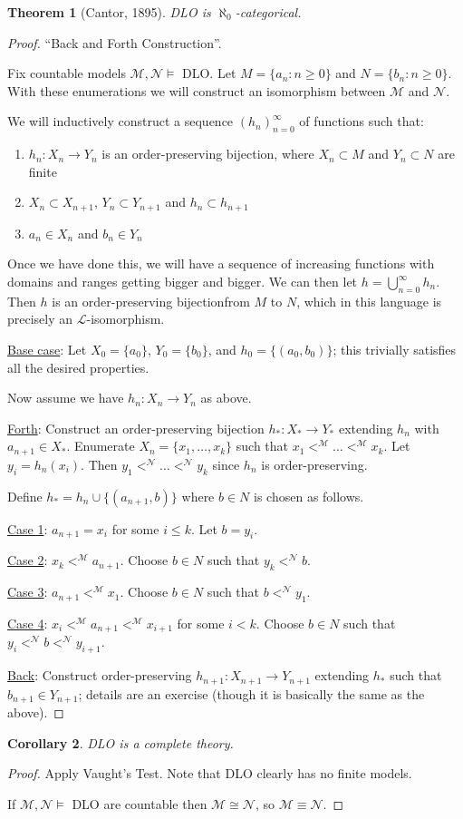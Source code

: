 \documentclass[]{article}
\theoremstyle{custhm}
\newtheorem{theorem}{Theorem}[section]
\theoremstyle{cusdef}
\theoremstyle{custhm}
\theoremstyle{custhm}
\newtheorem{cor}[theorem]{Corollary}
\theoremstyle{custhm}
\theoremstyle{ex}
\theoremstyle{custhm}
\theoremstyle{cusdef}
\theoremstyle{remark}
\newcommand{\ra}{\rightarrow}
\renewcommand{\L}{\mathcal{L}}
\newcommand{\M}{\mathcal{M}}
\newcommand{\N}{\mathcal{N}}
\begin{document}
\begin{theorem}[Cantor, 1895]
DLO is $\aleph_0$-categorical.
\end{theorem}
\begin{proof}
``Back and Forth Construction''.

Fix countable models $\M,\N\models$ DLO. Let $M = \{a_n:n\ge 0\}$ and $N = \{b_n:n\ge 0\}$. With these enumerations we will construct an isomorphism between $\M$ and $\N$.

We will inductively construct a sequence $(h_n)_{n=0}^{\infty}$ of functions such that:
\begin{enumerate}[label=\arabic*)]
	\item $h_n:X_n\ra Y_n$ is an order-preserving bijection, where $X_n\subset M$ and $Y_n\subset N$ are finite
	\item $X_n\subset X_{n+1}$, $Y_n\subset Y_{n+1}$ and $h_n\subset h_{n+1}$
	\item $a_n \in X_n$ and $b_n \in Y_n$
\end{enumerate}
Once we have done this, we will have a sequence of increasing functions with domains and ranges getting bigger and bigger. We can then let $h = \bigcup_{n=0}^{\infty}h_n$. Then $h$ is an order-preserving bijectionfrom $M$ to $N$, which in this language is precisely an $\L$-isomorphism.

\underline{Base case}: Let $X_0 = \{a_0\}$, $Y_0 = \{b_0\}$, and $h_0 = \{(a_0,b_0)\}$; this trivially satisfies all the desired properties.

Now assume we have $h_n:X_n\ra Y_n$ as above.

\underline{Forth}: Construct an order-preserving bijection $h_\ast:X_\ast\ra Y_\ast$ extending $h_n$ with $a_{n+1}\in X_\ast$. Enumerate $X_n = \{x_1,\dots,x_k\}$ such that $x_1 <^\M \dots <^\M x_k$. Let $y_i = h_n(x_i)$. Then $y_1 <^\N \dots <^\N y_k$ since $h_n$ is order-preserving.

Define $h_\ast = h_n \cup \{(a_{n+1},b)\}$ where $b\in N$ is chosen as follows.

\underline{Case 1}: $a_{n+1} = x_i$ for some $i\le k$. Let $b = y_i$.

\underline{Case 2}: $x_k <^\M a_{n+1}$. Choose $b\in N$ such that $y_k <^\N b$.

\underline{Case 3}: $a_{n+1} <^\M x_1$. Choose $b\in N$ such that $b <^\N y_1$.

\underline{Case 4}: $x_i <^\M a_{n+1} <^\M x_{i+1}$ for some $ i < k$. Choose $b \in N$ such that $y_i < ^\N b < ^\N y_{i+1}$.

\underline{Back}: Construct order-preserving $h_{n+1}:X_{n+1}\ra Y_{n+1}$ extending $h_\ast$ such that $b_{n+1}\in Y_{n+1}$; details are an exercise (though it is basically the same as the above).
\end{proof}
\begin{cor}
DLO is a complete theory.
\end{cor}
\begin{proof}
Apply Vaught's Test. Note that DLO clearly has no finite models.

If $\M,\N\models$ DLO are countable then $\M \cong \N$, so $\M \equiv \N$.
\end{proof}
\end{document}
